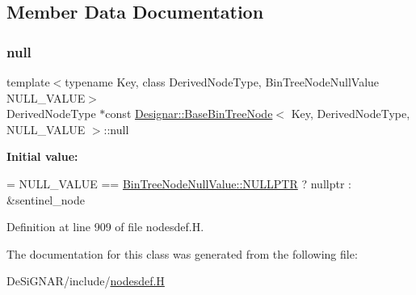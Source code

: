 \subsection{Member Data Documentation}
\mbox{\label{class_designar_1_1_base_bin_tree_node_a0ea0251169acae6e7943ccc54f66472a}} 
\subsubsection{\texorpdfstring{null}{null}}
{\footnotesize\ttfamily template$<$typename Key, class Derived\+Node\+Type, Bin\+Tree\+Node\+Null\+Value N\+U\+L\+L\+\_\+\+V\+A\+L\+UE$>$ \\
Derived\+Node\+Type $\ast$const \hyperlink{class_designar_1_1_base_bin_tree_node}{Designar\+::\+Base\+Bin\+Tree\+Node}$<$ Key, Derived\+Node\+Type, N\+U\+L\+L\+\_\+\+V\+A\+L\+UE $>$\+::null\hspace{0.3cm}{\ttfamily [static]}}

{\bfseries Initial value\+:}
\begin{DoxyCode}
=
    NULL\_VALUE == \hyperlink{namespace_designar_adc51778fc9415de368881abd254cca7cabf31abdbb1a298903e3a7f0edd0dcaf9}{BinTreeNodeNullValue::NULLPTR} ? nullptr : &sentinel\_node
\end{DoxyCode}


Definition at line 909 of file nodesdef.\+H.



The documentation for this class was generated from the following file\+:\begin{DoxyCompactItemize}
\item 
De\+Si\+G\+N\+A\+R/include/\hyperlink{nodesdef_8_h}{nodesdef.\+H}\end{DoxyCompactItemize}
